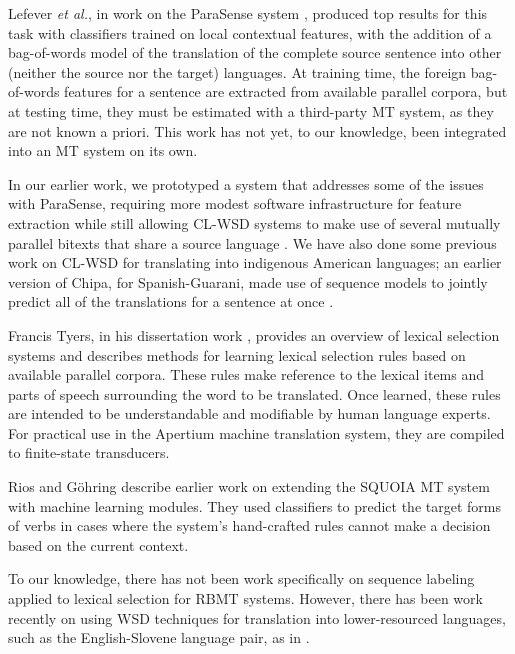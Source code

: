 Lefever \emph{et al.}, in work on the ParaSense system
\cite{lefever-hoste-decock:2011:ACL-HLT2011}, produced top results for
this task with classifiers trained on local contextual features, with the 
addition of a bag-of-words model of the translation of the complete source
sentence into other (neither the source nor the target) languages. At training
time, the foreign bag-of-words features for a sentence are extracted from
available parallel corpora, but at testing time, they must be
estimated with a third-party MT system, as they are not known a priori.
This work has not yet, to our knowledge, been integrated into an MT system
on its own.

In our earlier work, we prototyped a system that addresses some of the issues
with ParaSense, requiring more modest software infrastructure for feature
extraction while still allowing CL-WSD systems to make use of several mutually
parallel bitexts that share a source language
\cite{rudnick-liu-gasser:2013:SemEval-2013}.
We have also done some previous work on CL-WSD for translating into indigenous
American languages; an earlier version of Chipa, for Spanish-Guarani, made use
of sequence models to jointly predict all of the translations for a sentence at
once \cite{rudnick-gasser:2013:HyTra}.

Francis Tyers, in his dissertation work \cite{tyers-dissertation},
provides an overview of lexical selection systems and describes methods for
learning lexical selection rules based on available parallel corpora. These
rules make reference to the lexical items and parts of speech surrounding the
word to be translated. Once learned, these rules are intended to be
understandable and modifiable by human language experts. For practical use in
the Apertium machine translation system, they are compiled to finite-state
transducers.

Rios and G\"{o}hring \cite{riosgonzales-gohring:2013:HyTra} describe
earlier work on extending the SQUOIA MT system with machine learning modules.
They used classifiers to predict the target forms of verbs in cases where the
system's hand-crafted rules cannot make a decision based on the current
context.

To our knowledge, there has not been work specifically on sequence labeling
applied to lexical selection for RBMT systems. However, 
there has been work recently on using WSD techniques for translation into
lower-resourced languages, such as the English-Slovene language pair, as in 
\cite{vintar-fivser-vrvsvcaj:2012:ESIRMT-HyTra2012}. 

